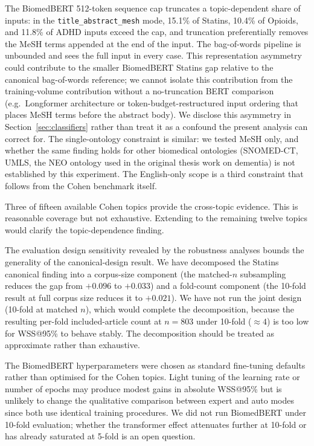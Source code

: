 \documentclass{article}
\begin{document}
The BiomedBERT 512-token sequence cap truncates a topic-dependent share of inputs: in the \texttt{title\_abstract\_mesh} mode, 15.1\% of Statins, 10.4\% of Opioids, and 11.8\% of ADHD inputs exceed the cap, and truncation preferentially removes the MeSH terms appended at the end of the input. The bag-of-words pipeline is unbounded and sees the full input in every case. This representation asymmetry could contribute to the smaller BiomedBERT Statins gap relative to the canonical bag-of-words reference; we cannot isolate this contribution from the training-volume contribution without a no-truncation BERT comparison (e.g.\ Longformer architecture or token-budget-restructured input ordering that places MeSH terms before the abstract body). We disclose this asymmetry in Section~\ref{sec:classifiers} rather than treat it as a confound the present analysis can correct for. The single-ontology constraint is similar: we tested MeSH only, and whether the same finding holds for other biomedical ontologies (SNOMED-CT, UMLS, the NEO ontology used in the original thesis work on dementia) is not established by this experiment. The English-only scope is a third constraint that follows from the Cohen benchmark itself.

Three of fifteen available Cohen topics provide the cross-topic evidence. This is reasonable coverage but not exhaustive. Extending to the remaining twelve topics would clarify the topic-dependence finding.

The evaluation design sensitivity revealed by the robustness analyses bounds the generality of the canonical-design result. We have decomposed the Statins canonical finding into a corpus-size component (the matched-$n$ subsampling reduces the gap from $+0.096$ to $+0.033$) and a fold-count component (the 10-fold result at full corpus size reduces it to $+0.021$). We have not run the joint design (10-fold at matched $n$), which would complete the decomposition, because the resulting per-fold included-article count at $n = 803$ under 10-fold ($\approx 4$) is too low for WSS@95\% to behave stably. The decomposition should be treated as approximate rather than exhaustive.

The BiomedBERT hyperparameters were chosen as standard fine-tuning defaults rather than optimised for the Cohen topics. Light tuning of the learning rate or number of epochs may produce modest gains in absolute WSS@95\% but is unlikely to change the qualitative comparison between expert and auto modes since both use identical training procedures. We did not run BiomedBERT under 10-fold evaluation; whether the transformer effect attenuates further at 10-fold or has already saturated at 5-fold is an open question.
\end{document}
